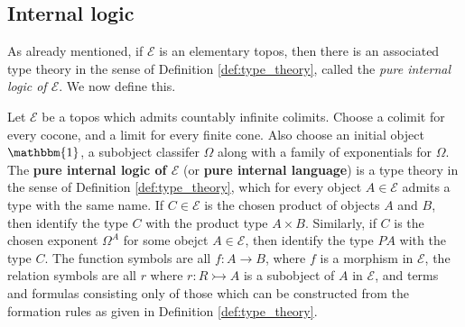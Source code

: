\documentclass{tac}
\newcommand{\call}[1]{\mathcal{#1}}
\begin{document}
	\subsection{Internal logic}
	\label{MitchellBenabou}
	As already mentioned, if $\call{E}$ is an elementary topos, then there is an associated type theory in the sense of Definition \ref{def:type_theory}, called the \emph{pure internal logic of $\call{E}$}. We now define this.
	\begin{definition}
		\label{def:internal_logic_pure}
		Let $\call{E}$ be a topos which admits countably infinite colimits. Choose a colimit for every cocone, and a limit for every finite cone. Also choose an initial object $\mathbbm{1}$, a subobject classifer $\Omega$ along with a family of exponentials for $\Omega$. The \textbf{pure internal logic of $\call{E}$} (or \textbf{pure internal language}) is a type theory in the sense of Definition \ref{def:type_theory}, which for every object $A \in \call{E}$ admits a type with the same name. If $C \in \call{E}$ is the chosen product of objects $A$ and $B$, then identify the type $C$ with the product type $A \times B$. Similarly, if $C$ is the chosen exponent $\Omega^A$ for some obejct $A \in \call{E}$, then identify the type $PA$ with the type $C$. The function symbols are all $f:A \to B$, where $f$ is a morphism in $\call{E}$, the relation symbols are all $r$ where $r: R \rightarrowtail A$ is a subobject of $A$ in $\call{E}$, and terms and formulas consisting only of those which can be constructed from the formation rules as given in Definition \ref{def:type_theory}.
	\end{definition}
\end{document}
